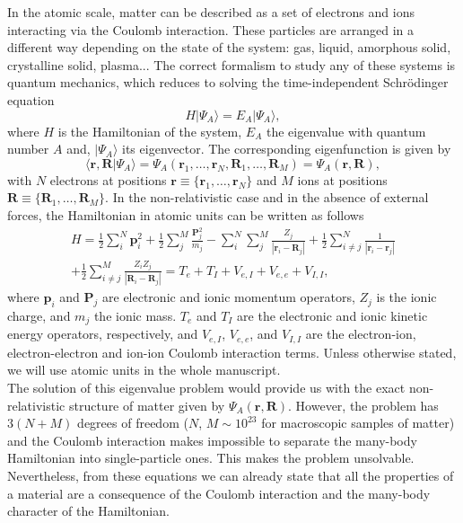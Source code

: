 In the atomic scale, matter can be described as a set of electrons and ions interacting via the Coulomb interaction. These particles are arranged in a different way depending on the state of the system: gas, liquid, amorphous 
solid, crystalline solid, plasma... The correct formalism to study any of these systems is quantum mechanics, which reduces to solving the time-independent Schr\"odinger equation
\begin{equation}
\label{schrodinger}
 H|\Psi_{A}\rangle=E_{A}|\Psi_{A}\rangle,
\end{equation}
where $H$ is the Hamiltonian of the system, $E_{A}$ the eigenvalue with quantum number $A$ and, $|\Psi_{A}\rangle$ its eigenvector. The corresponding eigenfunction is given by
\begin{equation}
 \langle\mathbf{r},\mathbf{R}|\Psi_{A}\rangle=\Psi_{A}(\mathbf{r}_{1},\dots,\mathbf{r}_{N},\mathbf{R}_{1},\dots,\mathbf{R}_{M})=\Psi_{A}(\mathbf{r},\mathbf{R}),
\end{equation}
with $N$ electrons at positions $\mathbf{r}\equiv\{\mathbf{r}_{1},\dots,\mathbf{r}_{N}\}$ and $M$ ions at positions 
\\ $\mathbf{R}\equiv\{\mathbf{R}_{1},\dots,\mathbf{R}_{M}\}$. In the non-relativistic case and in the 
absence of external forces, the Hamiltonian in atomic units can be written as follows\cite{martin2004electronic}
\begin{multline}
 H=\frac{1}{2}\sum_{i}^{N}\mathbf{p}_{i}^{2}+\frac{1}{2}\sum_{j}^{M}\frac{\mathbf{P}_{j}^{2}}{m_{j}}-\sum_{i}^{N}\sum_{j}^{M}\frac{Z_{j}}{|\mathbf{r}_{i}-\mathbf{R}_{j}|}+\frac{1}{2}\sum_{i\ne j}^{N}\frac{1}{|\mathbf{r}_{i}-
 \mathbf{r}_{j}|}\\+\frac{1}{2}\sum_{i\ne j}^{M}\frac{Z_{i}Z_{j}}{|\mathbf{R}_{i}-\mathbf{R}_{j}|}=T_{e}+T_{I}+V_{e,I}+V_{e,e}+V_{I,I},
\end{multline}
where $\mathbf{p}_{i}$ and $\mathbf{P}_{j}$ are electronic and ionic momentum operators, $Z_{j}$ is the ionic charge, and $m_{j}$ the ionic mass. $T_{e}$ and $T_{I}$ are the electronic and ionic kinetic energy operators, 
respectively, and $V_{e,I}$, $V_{e,e}$, and $V_{I,I}$ are the electron-ion, electron-electron and ion-ion Coulomb 
interaction terms. Unless otherwise stated, we will use atomic units in the whole manuscript. \\

The solution of this eigenvalue problem would provide us with the exact non-relativistic structure of matter given by $\Psi_{A}(\mathbf{r},\mathbf{R})$. However, the problem 
has $3(N+M)$ degrees of freedom ($N$, $M\sim10^{23}$ for macroscopic samples of matter) and the Coulomb interaction makes impossible to separate the many-body Hamiltonian into single-particle ones. This makes the problem 
unsolvable. Nevertheless, from these equations we can already state that all the properties of a material are a consequence of the Coulomb interaction and the many-body character of the Hamiltonian. \\

